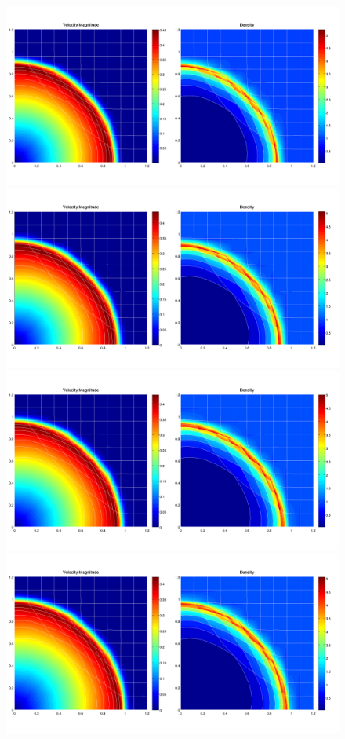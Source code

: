 \documentclass[8pt,xcolor=svgnames]{beamer}
\begin{document}
\begin{frame}
\begin{figure}[ht]
\begin{animateinline}[autoplay,width=\textwidth]{1}
    \newframe[1]
    \includegraphics{./Images/SedovAnimation/SedovAnimation_160.png}
    \newframe[1]
    \includegraphics{./Images/SedovAnimation/SedovAnimation_170.png}
    \newframe[1]
    \includegraphics{./Images/SedovAnimation/SedovAnimation_180.png}
    \newframe[1]
    \includegraphics{./Images/SedovAnimation/SedovAnimation_190.png}

\end{animateinline}
\end{figure}
\end{frame}
\end{document}
